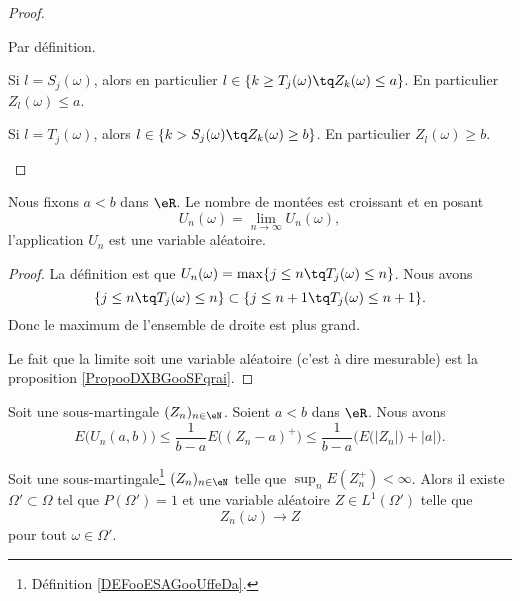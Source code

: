 \begin{proof}
\begin{subproof}
		\spitem[\( S_{j+1}<T_{j+1}\)]
		Par définition.

		\spitem[\( Z_{S_j}\leq a\)]
		Si \( l=S_j(\omega)\), alors en particulier \( l\in \{ k\geq T_j(\omega)\tq Z_k(\omega)\leq a \}\). En particulier \( Z_l(\omega)\leq a\).

		\spitem[\( b\leq Z_{T_j}\)]
		Si \( l=T_j(\omega)\), alors \( l\in\{ k>S_j(\omega)\tq Z_k(\omega)\geq b \}\). En particulier \( Z_l(\omega)\geq b\).
	\end{subproof}
\end{proof}

\begin{proposition}	\label{PROPooSGXJooQkbyMH}
	Nous fixons \( a<b\) dans \( \eR\). Le nombre de montées est croissant et en posant
	\begin{equation}
		U_n(\omega)=\lim_{n\to \infty}U_n(\omega),
	\end{equation}
	l'application \( U_n\) est une variable aléatoire.
\end{proposition}

\begin{proof}
	La définition est que \( U_n(\omega)=\max\{ j\leq n\tq T_j(\omega)\leq n \}\). Nous avons
	\begin{equation}
		\{ j\leq n\tq T_j(\omega)\leq n \}\subset \{ j\leq n+1\tq T_j(\omega)\leq n+1 \}.
	\end{equation}
	Donc le maximum de l'ensemble de droite est plus grand.

	Le fait que la limite soit une variable aléatoire (c'est à dire mesurable) est la proposition \ref{PropooDXBGooSFqrai}.
\end{proof}

\begin{theorem}	\label{THOooZKNNooVdOxKu}
	Soit une sous-martingale \( (Z_n)_{n\in \eN}\). Soient \( a<b\) dans \( \eR\). Nous avons
	\begin{equation}
		E\big( U_n(a,b) \big)\leq \frac{1}{ b-a}E\Big( (Z_n-a)^+ \Big)\leq \frac{1}{ b-a}\Big( E\big( | Z_n | \big)+| a | \Big).
	\end{equation}
\end{theorem}


\begin{proposition}	\label{PROPooMFRFooHMIjsy}
	Soit une sous-martingale\footnote{Définition \ref{DEFooESAGooUffeDa}.} \( (Z_n)_{n\in \eN}\) telle que \( \sup_n E(Z^+_n)<\infty\). Alors il existe \( \Omega'\subset \Omega\) tel que \( P(\Omega')=1\) et une variable aléatoire \( Z\in L^1(\Omega')\) telle que
	\begin{equation}
		Z_n(\omega)\to Z
	\end{equation}
	pour tout \( \omega\in \Omega'\).
\end{proposition}

